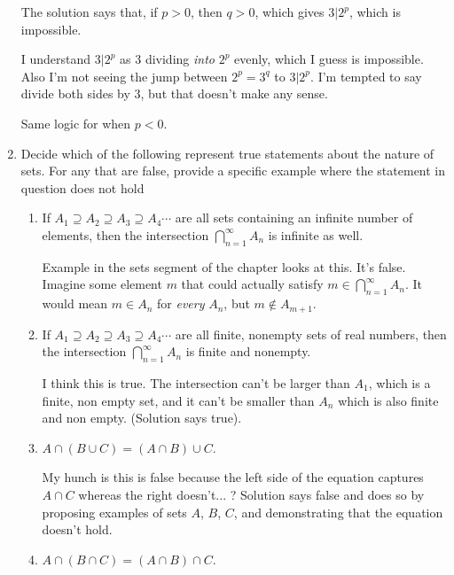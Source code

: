 \documentclass{article}
\numberwithin{equation}{subsection}
\numberwithin{theo}{subsection}
\begin{document}
\begin{enumerate}
The solution says that, if $p > 0$, then $q > 0$, which gives $3|2^p$, which is
impossible.

I understand $3|2^p$ as $3$ dividing \emph{into} $2^p$ evenly, which I guess is
impossible. Also I'm not seeing the jump between $2^p = 3^q$ to $3|2^p$. I'm
tempted to say divide both sides by $3$, but that doesn't make any sense.

Same logic for when $p < 0$.

\item Decide which of the following represent true statements about the nature
    of sets. For any that are false, provide a specific example where the
    statement in question does not hold

    \begin{enumerate}
        \item If $A_1 \supseteq A_2 \supseteq A_3 \supseteq A_4 \cdots$ are all
            sets containing an infinite number of elements, then the
            intersection $\bigcap_{n=1}^\infty A_n$ is infinite as well.

            Example in the sets segment of the chapter looks at this. It's
            false. Imagine some element $m$ that could actually satisfy $m \in
            \bigcap_{n=1}^{\infty} A_n$. It would mean $m \in A_n$ for
            \emph{every} $A_n$, but $m \notin A_{m+1}$.

        \item If $A_1 \supseteq A_2 \supseteq A_3 \supseteq A_4 \cdots$ are all
            finite, nonempty sets of real numbers, then the intersection
            $\bigcap_{n=1}^\infty A_n$ is finite and nonempty.

            I think this is true. The intersection can't be larger than $A_1$,
            which is a finite, non empty set, and it can't be smaller than $A_n$
            which is also finite and non empty. (Solution says true).

        \item $A \cap (B \cup C) = (A \cap B) \cup C$.
            
            My hunch is this is false because the left side of the equation
            captures $A \cap C$ whereas the right doesn't... ? Solution says
            false and does so by proposing examples of sets $A$, $B$, $C$, and
            demonstrating that the equation doesn't hold.

        \item $A \cap (B \cap C) = (A \cap B) \cap C$.


\end{enumerate}
\end{enumerate}
\end{document}

